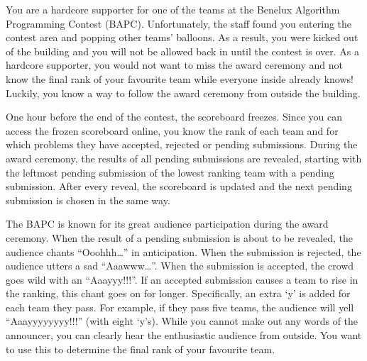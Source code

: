 \problemname{}


\newcommand{\maxnm}{100}

You are a hardcore supporter for one of the teams at the Benelux Algorithm Programming Contest (BAPC).
Unfortunately, the staff found you entering the contest area and popping
other teams' balloons. As a result, you were kicked out of the building
and you will not be allowed back in until the contest is over. As a
hardcore supporter, you would not want to miss the award
ceremony and not know the final rank of your favourite team while
everyone inside already knows! Luckily, you know a way to
follow the award ceremony from outside the building.

One hour before the end of the contest, the scoreboard freezes.
Since you can access the frozen scoreboard online,
you know the rank of each team and for
which problems they have accepted, rejected or pending submissions.
During the award ceremony, the results of all pending submissions are
revealed, starting with the leftmost pending submission of the lowest
ranking team with a pending submission. After every reveal, the
scoreboard is updated and the next pending submission is chosen in the
same way.

The BAPC is known for its great audience participation during the award
ceremony. When the result of a pending submission is about to be
revealed, the audience chants ``Ooohhh\ldots'' in anticipation. When the
submission is rejected, the audience utters a sad ``Aaawww\ldots''. When the
submission is accepted, the crowd goes wild with an ``Aaayyy!!!''. If
an accepted submission causes a team to rise in the ranking, this chant
goes on for longer. Specifically, an extra `y' is added for each team
they pass. For example, if they pass five teams, the audience will yell
``Aaayyyyyyyy!!!'' (with eight `y's). While you cannot make out any words of the
announcer, you can clearly hear the enthusiastic audience from outside.
You want to use this to determine the final rank of your favourite team.


